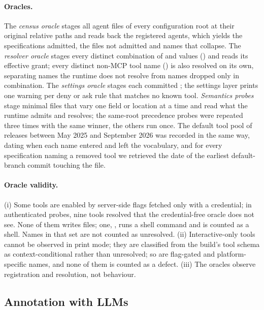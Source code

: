 \paragraph{Oracles.} The \emph{census oracle} stages all agent files of every configuration root at their original
relative paths and reads back the registered agents, which yields the specifications admitted, the files not admitted
and names that collapse. The \emph{resolver oracle} stages every distinct combination of  and
 values (\nDistinctGrants{}) and reads its effective grant; every distinct non-MCP tool name
(\nDistinctNames{}) is also resolved on its own, separating names the runtime does not resolve from names dropped only
in combination. The \emph{settings oracle} stages each committed ; the settings layer prints
one warning per deny or ask rule that matches no known tool. \emph{Semantics probes} stage minimal files that vary
one field or location at a time and read what the runtime admits and resolves; the same-root precedence probes were repeated three times with the same winner, the others run
once. The default tool pool of
\nReleasesHistory{} releases between May 2025 and September 2026 was recorded in the same way, dating when each name
entered and left the vocabulary, and for every specification naming a removed tool we retrieved the date of the
earliest default-branch commit touching the file.

\paragraph{Oracle validity.} (i) Some tools are enabled by server-side flags fetched only with a credential; in
authenticated probes, nine tools resolved that the credential-free oracle does not see. None of them writes files; one,
, runs a shell command and is counted as a shell. Names in that set are not counted as unresolved.
(ii) Interactive-only tools cannot be observed in print mode; they are classified from the build's tool schema as
context-conditional rather than unresolved; so are flag-gated and platform-specific names, and none of them is
counted as a defect. (iii) The oracles observe registration and resolution, not behaviour.

\subsection{Annotation with LLMs}
\label{sec:annotation}

